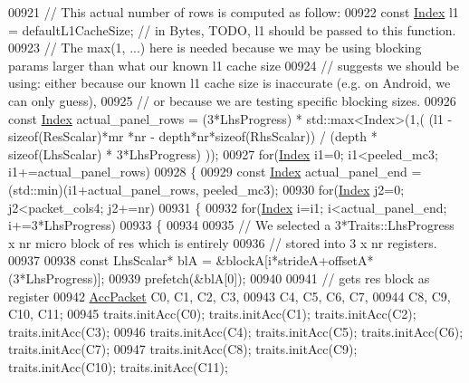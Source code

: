 \begin{DoxyCode}
00921       \textcolor{comment}{// This actual number of rows is computed as follow:}
00922       \textcolor{keyword}{const} \hyperlink{namespace_eigen_a62e77e0933482dafde8fe197d9a2cfde}{Index} l1 = defaultL1CacheSize; \textcolor{comment}{// in Bytes, TODO, l1 should be passed to this function.}
00923       \textcolor{comment}{// The max(1, ...) here is needed because we may be using blocking params larger than what our known
       l1 cache size}
00924       \textcolor{comment}{// suggests we should be using: either because our known l1 cache size is inaccurate (e.g. on
       Android, we can only guess),}
00925       \textcolor{comment}{// or because we are testing specific blocking sizes.}
00926       \textcolor{keyword}{const} \hyperlink{namespace_eigen_a62e77e0933482dafde8fe197d9a2cfde}{Index} actual\_panel\_rows = (3*LhsProgress) * std::max<Index>(1,( (l1 - \textcolor{keyword}{sizeof}(ResScalar)*mr
      *nr - depth*nr*\textcolor{keyword}{sizeof}(RhsScalar)) / (depth * \textcolor{keyword}{sizeof}(LhsScalar) * 3*LhsProgress) ));
00927       \textcolor{keywordflow}{for}(\hyperlink{namespace_eigen_a62e77e0933482dafde8fe197d9a2cfde}{Index} i1=0; i1<peeled\_mc3; i1+=actual\_panel\_rows)
00928       \{
00929         \textcolor{keyword}{const} \hyperlink{namespace_eigen_a62e77e0933482dafde8fe197d9a2cfde}{Index} actual\_panel\_end = (std::min)(i1+actual\_panel\_rows, peeled\_mc3);
00930         \textcolor{keywordflow}{for}(\hyperlink{namespace_eigen_a62e77e0933482dafde8fe197d9a2cfde}{Index} j2=0; j2<packet\_cols4; j2+=nr)
00931         \{
00932           \textcolor{keywordflow}{for}(\hyperlink{namespace_eigen_a62e77e0933482dafde8fe197d9a2cfde}{Index} i=i1; i<actual\_panel\_end; i+=3*LhsProgress)
00933           \{
00934           
00935           \textcolor{comment}{// We selected a 3*Traits::LhsProgress x nr micro block of res which is entirely}
00936           \textcolor{comment}{// stored into 3 x nr registers.}
00937           
00938           \textcolor{keyword}{const} LhsScalar* blA = &blockA[i*strideA+offsetA*(3*LhsProgress)];
00939           prefetch(&blA[0]);
00940 
00941           \textcolor{comment}{// gets res block as register}
00942           \hyperlink{class_eigen_1_1internal_1_1_tensor_lazy_evaluator_writable}{AccPacket} C0, C1, C2,  C3,
00943                     C4, C5, C6,  C7,
00944                     C8, C9, C10, C11;
00945           traits.initAcc(C0);  traits.initAcc(C1);  traits.initAcc(C2);  traits.initAcc(C3);
00946           traits.initAcc(C4);  traits.initAcc(C5);  traits.initAcc(C6);  traits.initAcc(C7);
00947           traits.initAcc(C8);  traits.initAcc(C9);  traits.initAcc(C10); traits.initAcc(C11);

\end{DoxyCode}
